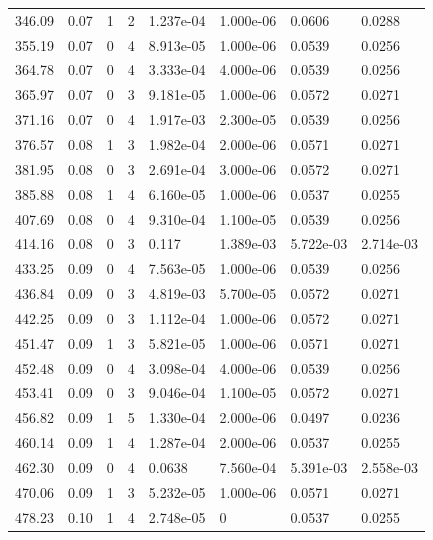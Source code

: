 \documentclass[preview]{standalone}
\begin{document}
{{{\begin{tabular}{L{1.2cm}C{1.2cm} C{0.3cm}C{0.5cm} C{1.4cm}C{1.4cm} C{1.4cm}C{1.4cm}}
  346.09  &  0.07  & 1     &  2 &  1.237e-04  & 1.000e-06  & 0.0606 &  0.0288   \\ 
  355.19  &  0.07  & 0     &  4 &  8.913e-05  & 1.000e-06  & 0.0539 &  0.0256   \\ 
  364.78  &  0.07  & 0     &  4 &  3.333e-04  & 4.000e-06  & 0.0539 &  0.0256   \\ 
  365.97  &  0.07  & 0     &  3 &  9.181e-05  & 1.000e-06  & 0.0572 &  0.0271   \\ 
  371.16  &  0.07  & 0     &  4 &  1.917e-03  & 2.300e-05  & 0.0539 &  0.0256   \\ 
  376.57  &  0.08  & 1     &  3 &  1.982e-04  & 2.000e-06  & 0.0571 &  0.0271   \\ 
  381.95  &  0.08  & 0     &  3 &  2.691e-04  & 3.000e-06  & 0.0572 &  0.0271   \\ 
  385.88  &  0.08  & 1     &  4 &  6.160e-05  & 1.000e-06  & 0.0537 &  0.0255   \\ 
  407.69  &  0.08  & 0     &  4 &  9.310e-04  & 1.100e-05  & 0.0539 &  0.0256   \\ 
  414.16  &  0.08  & 0     &  3 &  0.117  & 1.389e-03  & 5.722e-03 &  2.714e-03   \\ 
  433.25  &  0.09  & 0     &  4 &  7.563e-05  & 1.000e-06  & 0.0539 &  0.0256   \\ 
  436.84  &  0.09  & 0     &  3 &  4.819e-03  & 5.700e-05  & 0.0572 &  0.0271   \\ 
  442.25  &  0.09  & 0     &  3 &  1.112e-04  & 1.000e-06  & 0.0572 &  0.0271   \\ 
  451.47  &  0.09  & 1     &  3 &  5.821e-05  & 1.000e-06  & 0.0571 &  0.0271   \\ 
  452.48  &  0.09  & 0     &  4 &  3.098e-04  & 4.000e-06  & 0.0539 &  0.0256   \\ 
  453.41  &  0.09  & 0     &  3 &  9.046e-04  & 1.100e-05  & 0.0572 &  0.0271   \\ 
  456.82  &  0.09  & 1     &  5 &  1.330e-04  & 2.000e-06  & 0.0497 &  0.0236   \\ 
  460.14  &  0.09  & 1     &  4 &  1.287e-04  & 2.000e-06  & 0.0537 &  0.0255   \\ 
  462.30  &  0.09  & 0     &  4 &  0.0638  & 7.560e-04  & 5.391e-03 &  2.558e-03   \\ 
  470.06  &  0.09  & 1     &  3 &  5.232e-05  & 1.000e-06  & 0.0571 &  0.0271   \\ 
  478.23  &  0.10  & 1     &  4 &  2.748e-05  & 0  & 0.0537 &  0.0255   \\ 

\end{tabular}}}}
\end{document}
